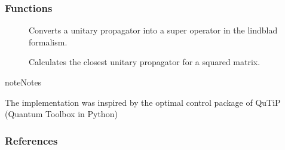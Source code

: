 \documentclass[letterpaper,10pt,english]{sphinxmanual}
\begin{document}
\subsubsection{Functions}
\label{\detokenize{qsim:id15}}\begin{description}
\item[{{\hyperref[\detokenize{qsim:qsim.matrix.convert_unitary_to_super_operator}]{}}}] \leavevmode
Converts a unitary propagator into a super operator in the lindblad
formalism.

\item[{{\hyperref[\detokenize{qsim:qsim.matrix.closest_unitary}]{}}}] \leavevmode
Calculates the closest unitary propagator for a squared matrix.

\end{description}

\begin{sphinxadmonition}{note}{Notes}

The implementation was inspired by the optimal control package of QuTiP 
(Quantum Toolbox in Python)
\end{sphinxadmonition}
\subsubsection*{References}
\end{document}
